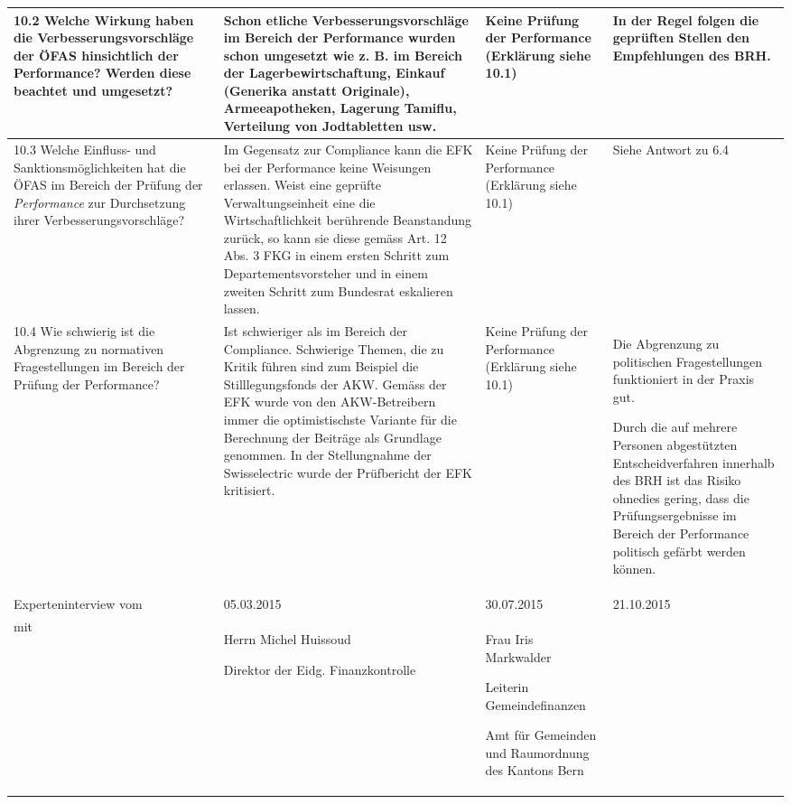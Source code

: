 \documentclass[10pt]{article}
\begin{document}
\begin{landscape}
\begin{center}
\begin{longtable}{|p{4cm}|p{5cm}|p{7.5cm}|p{7.5cm}|}
 \\
\hline
10.2 Welche Wirkung haben die Verbesserungsvorschläge der ÖFAS hinsichtlich der Performance? Werden diese beachtet und umgesetzt? & Schon etliche Verbesserungs­vorschläge im Bereich der Performance wurden schon umgesetzt wie z. B. im Bereich der Lagerbewirtschaftung, Einkauf (Generika anstatt Originale), Armeeapotheken, Lagerung Tamiflu, Verteilung von Jodtabletten usw. & Keine Prüfung der Performance (Erklärung siehe 10.1) & In der Regel folgen die geprüften Stellen den Empfehlungen des BRH. \\
\hline
10.3 Welche Einfluss- und Sanktions­möglich­keiten hat die ÖFAS im Bereich der Prüfung der \textit{Performance} zur Durchsetzung ihrer Verbesserungsvorschläge? & Im Gegensatz zur Compliance kann die EFK bei der Performance keine Weisungen erlassen. Weist eine geprüfte Verwaltungseinheit eine die Wirtschaftlichkeit berührende Beanstandung zurück, so kann sie diese gemäss Art. 12 Abs. 3 FKG in einem ersten Schritt zum Departementsvorsteher und in einem zweiten Schritt zum Bundesrat eskalieren lassen. & Keine Prüfung der Performance (Erklärung siehe 10.1) & Siehe Antwort zu 6.4 \\
\hline
10.4 Wie schwierig ist die Abgrenzung zu normativen Fragestellungen im Bereich der Prüfung der Performance? & Ist schwieriger als im Bereich der Compliance. Schwierige Themen, die zu Kritik führen sind zum Beispiel die Stilllegungsfonds der AKW. Gemäss der EFK wurde von den AKW-Betreibern immer die optimistischste Variante für die Berechnung der Beiträge als Grundlage genommen. In der Stellungnahme der Swisselectric wurde der Prüfbericht der EFK kritisiert. & Keine Prüfung der Performance (Erklärung siehe 10.1) & Die Abgrenzung zu politischen Fragestellungen funktioniert in der Praxis gut. 

Durch die auf mehrere Personen abgestützten Entscheidverfahren innerhalb des BRH ist das Risiko ohnedies gering, dass die Prüfungsergebnisse im Bereich der Performance politisch gefärbt werden können.

 \\
\hline
Experteninterview vom & 05.03.2015 & 30.07.2015 & 21.10.2015 \\
\hline
mit & Herrn Michel Huissoud

Direktor der Eidg. Finanzkontrolle

 & Frau Iris Markwalder

Leiterin Gemeindefinanzen

Amt für Gemeinden und Raumordnung des Kantons Bern


\end{longtable}
\end{center}
\end{landscape}
\end{document}
